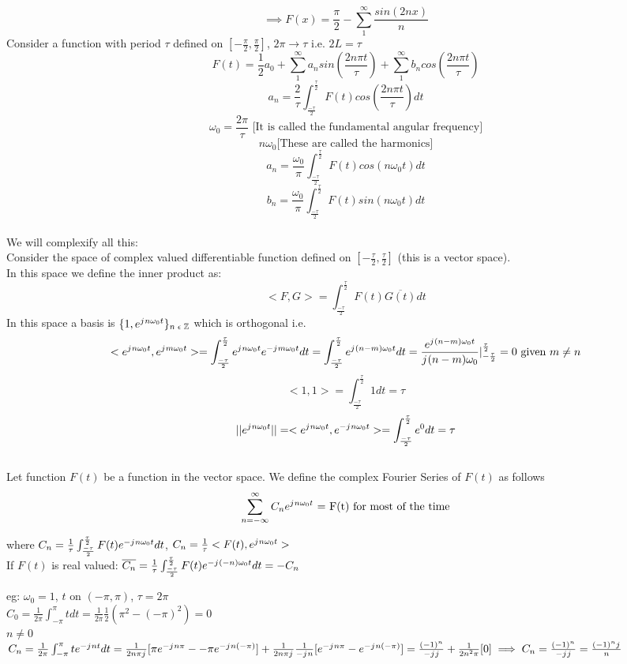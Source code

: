 \documentclass[11pt]{article}
\theoremstyle{definition}
\newcommand{\Z}{\mathbb{Z}}
\newcommand{\iu}{{j\mkern1mu}}
\begin{document}
$$\implies F(x) = \frac{\pi}{2} - \sum^\infty_1 \frac{sin(2nx)}{n}$$
\newpage
Consider a function with period $\tau$ defined on $[-\frac{\pi}{2}, \frac{\pi}{2}]$, $2\pi \rightarrow \tau$ i.e. $2L = \tau$
$$F(t) = \frac{1}{2}a_0 + \sum^\infty_1 a_nsin(\frac{2n\pi t}{\tau}) + \sum^\infty_1 b_ncos(\frac{2n\pi t}{\tau})$$
$$a_n = \frac{2}{\tau}\int^{\frac{\tau}{2}}_{\frac{-\tau}{2}}F(t) cos(\frac{2n\pi t}{\tau})dt$$
$$\omega_0 = \frac{2\pi}{\tau} \text{ [It is called the fundamental angular frequency]}$$
$$n\omega_0 \text{[These are called the harmonics]}$$
$$a_n = \frac{\omega_0}{\pi} \int^{\frac{\tau}{2}}_{\frac{-\tau}{2}}F(t) cos(n\omega_0t)dt$$
$$b_n = \frac{\omega_0}{\pi} \int^{\frac{\tau}{2}}_{\frac{-\tau}{2}}F(t) sin(n\omega_0t)dt$$
\\
We will complexify all this:\\
Consider the space of complex valued differentiable function defined on $[-\frac{\tau}{2}, \frac{\tau}{2}]$ (this is a vector space).\\
In this space we define the inner product as:
$$<F,G> = \int^{\frac{\tau}{2}}_{\frac{-\tau}{2}} F(t)\overline{G(t)}dt$$
In this space a basis is $\{1, e^{\iu n\omega_0 t}\}_{n\; \epsilon\; \Z}$ which is orthogonal i.e.
$$<e^{\iu n\omega_0 t}, e^{\iu m\omega_0 t}> = \int^{\frac{\tau}{2}}_{\frac{-\tau}{2}} e^{\iu n\omega_0 t} e^{-\iu m\omega_0 t}dt = \int^{\frac{\tau}{2}}_{\frac{-\tau}{2}} e^{\iu (n-m)\omega_0 t}dt = \frac{e^{\iu(n-m)\omega_0t}}{\iu (n-m)\omega_0}|^\frac{\tau}{2}_{-\frac{\tau}{2}} = 0 \text{ given }m \neq n$$
$$<1,1> = \int^{\frac{\tau}{2}}_{\frac{-\tau}{2}} 1dt = \tau$$
$$||e^{\iu n\omega_0 t}|| =  <e^{\iu n\omega_0 t}, e^{-\iu n\omega_0 t}> = \int^{\frac{\tau}{2}}_{\frac{-\tau}{2}} e^0dt = \tau$$\\
Let function $F(t)$ be a function in the vector space. We define the complex Fourier Series of $F(t)$ as follows 
$$\sum^\infty_{n=-\infty}C_ne^{
\iu n\omega_0t} \text{   = F(t) for most of the time}$$

where $C_n = \frac{1}{\tau} \int^{\frac{\tau}{2}}_{\frac{-\tau}{2}} F(t)e^{-\iu n \omega_0t} dt$, $C_n = \frac{1}{\tau} <F(t), e^{\iu n \omega_0 t}>$\\
If $F(t)$ is real valued: $\overline{C_n} = \frac{1}{\tau} \int^{\frac{\tau}{2}}_{\frac{-\tau}{2}} F(t)e^{-\iu (-n) \omega_0t} dt = -C_n$

eg: $\omega_0 = 1$, $t \text{ on } (-\pi, \pi)$, $\tau = 2\pi$\\
$C_0 = \frac{1}{2\pi} \int^\pi_{-\pi}tdt = \frac{1}{2\pi}\frac{1}{2}(\pi^2 - (-\pi)^2) = 0$\\
$n \neq 0$\\
$C_n = \frac{1}{2\pi} \int^\pi_{-\pi}t e^{-\iu n t}dt = \frac{1}{2n\pi \iu}[\pi e^{-\iu n \pi } - -\pi e^{-\iu n (-\pi) }] + \frac{1}{2n\pi \iu}\frac{1}{-\iu n}[e^{-\iu n \pi } - e^{-\iu n (-\pi) }] = \frac{(-1)^n}{- \iu j} + \frac{1}{2n^2\pi}[0]\\ \implies C_n =  \frac{(-1)^n}{- \iu j} = \frac{(-1)^n\iu}{n}$
\end{document}
